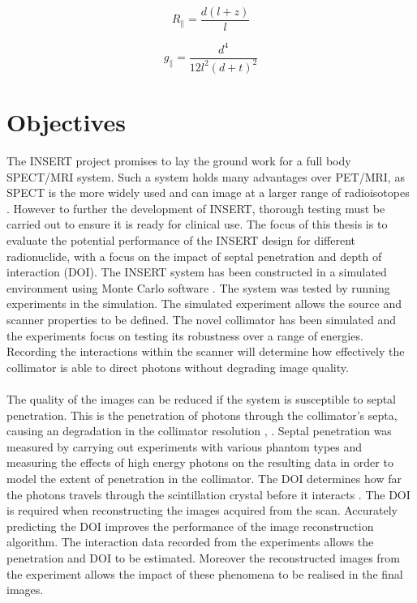 \begin{equation} \label{eqn:ParholeRes}
        R_{\parallel} = \frac{d(l + z)}{l}
\end{equation}


\begin{equation} \label{eqn:ParholeSen}
        g_{\parallel} = \frac{d^{4}}{12l^{2}(d+t)^{2}}
\end{equation}


\section{Objectives}
The INSERT project promises to lay the ground work for a full body SPECT/MRI system. Such a system holds many advantages over PET/MRI, as SPECT is the more widely used and can image at a larger range of radioisotopes \cite{doi:10.1177/153303460600500406}. However to further the development of INSERT, thorough testing must be carried out to ensure it is ready for clinical use. The focus of this thesis is to evaluate the potential performance of the INSERT design for different radionuclide, with a focus on the impact of septal penetration and depth of interaction (DOI). The INSERT system has been constructed in a simulated environment using Monte Carlo software \cite{1236960}. The system was tested by running experiments in the simulation. The simulated experiment allows the source and scanner properties to be defined. The novel collimator has been simulated and the experiments focus on testing its robustness over a range of energies. Recording the interactions within the scanner will determine how effectively the collimator is able to direct photons without degrading image quality.
\paragraph{} 
The quality of the images can be reduced if the system is susceptible to septal penetration. This is the penetration of photons through the collimator's septa, causing an degradation in the collimator resolution \cite{0031-9155-18-6-005}, \cite{0031-9155-50-21-004}. Septal penetration was measured by carrying out experiments with various phantom types and measuring the effects of high energy photons on the resulting data in order to model the extent of penetration in the collimator. The DOI determines how far the photons travels through the scintillation crystal before it interacts \cite{0031-9155-55-2-N04}. The DOI is required when reconstructing the images acquired from the scan. Accurately predicting the DOI improves the performance of the image reconstruction algorithm. The interaction data recorded from the experiments allows the penetration and DOI to be estimated. Moreover the reconstructed images from the experiment allows the impact of these phenomena to be realised in the final images.

